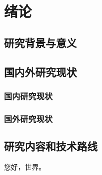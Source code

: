 \chapter{绪论}

\section{研究背景与意义}


\section{国内外研究现状}

\subsection{国内研究现状}

\subsection{国外研究现状}


\section{研究内容和技术路线}

您好，世界。
\lipsum[1-20]
